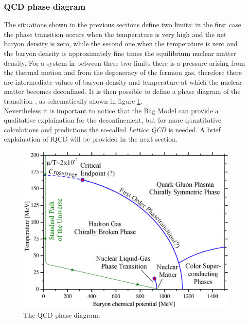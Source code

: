 \documentclass[b5paper,10pt,twoside,oldstyle,classica]{toptesi}
\begin{document}
\subsubsection{QCD phase diagram}
The situations shown in the previous sections define two limits: in the first case the phase transition occurs when the temperature is very high and the net baryon density is zero, while the second one when the temperature is zero and the baryon density is approximately fine times the equilibrium nuclear matter density. For a system in between these two limits there is a pressure arising from the thermal motion and from the degeneracy of the fermion gas, therefore there are intermediate values of baryon density and temperature at which the nuclear matter becomes deconfined. It is then possible to define a phase diagram of the transition \cite{Hands:2001}, as schematically shown in figure \ref{phasediagram}.\\
Nevertheless it is important to notice that the Bag Model can provide a qualitative explaination for the deconfinement, but for more quantitative calculations and predictions the so-called \textit{Lattice QCD} is needed. A brief explaination of lQCD will be provided in the next section.
\begin{figure}[tb]
\begin{center}
\includegraphics[scale = 0.17]{qcd_phasediagram.png}
\caption{The QCD phase diagram.}
\label{phasediagram}
\end{center}
\end{figure}
\end{document}
